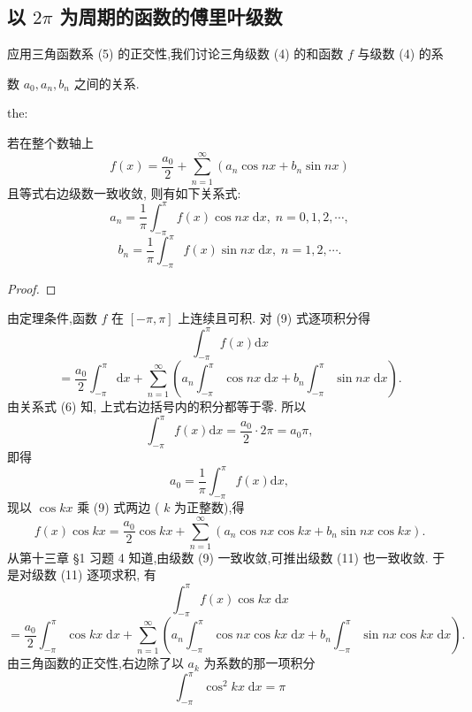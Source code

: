 \subsection{以 \({2\pi }\) 为周期的函数的傅里叶级数}

应用三角函数系 (5) 的正交性,我们讨论三角级数 (4) 的和函数 \(f\) 与级数 (4) 的系

数 \({a}_{0},{a}_{n},{b}_{n}\) 之间的关系.

\begin{theorem}{}{the:}

\end{theorem}
 若在整个数轴上
\[
f\left( x\right)  = \frac{{a}_{0}}{2} + \mathop{\sum }\limits_{{n = 1}}^{\infty }\left( {{a}_{n}\cos {nx} + {b}_{n}\sin {nx}}\right)  \tag{9}
\]
且等式右边级数一致收敛, 则有如下关系式:
\[
{a}_{n} = \frac{1}{\pi }{\int }_{-\pi }^{\pi }f\left( x\right) \cos {nx}\mathrm{\;d}x,\;n = 0,1,2,\cdots , \tag{10}
\]
\[
{b}_{n} = \frac{1}{\pi }{\int }_{-\pi }^{\pi }f\left( x\right) \sin {nx}\mathrm{\;d}x,\;n = 1,2,\cdots .
\]
\begin{proof}

\end{proof}
由定理条件,函数 \(f\) 在 \(\left\lbrack  {-\pi ,\pi }\right\rbrack\) 上连续且可积. 对 (9) 式逐项积分得
\[
{\int }_{-\pi }^{\pi }f\left( x\right) \mathrm{d}x
\]
\[
= \frac{{a}_{0}}{2}{\int }_{-\pi }^{\pi }\mathrm{d}x + \mathop{\sum }\limits_{{n = 1}}^{\infty }\left( {{a}_{n}{\int }_{-\pi }^{\pi }\cos {nx}\mathrm{\;d}x + {b}_{n}{\int }_{-\pi }^{\pi }\sin {nx}\mathrm{\;d}x}\right) .
\]
由关系式 (6) 知, 上式右边括号内的积分都等于零. 所以
\[
{\int }_{-\pi }^{\pi }f\left( x\right) \mathrm{d}x = \frac{{a}_{0}}{2} \cdot  {2\pi } = {a}_{0}\pi ,
\]
即得
\[
{a}_{0} = \frac{1}{\pi }{\int }_{-\pi }^{\pi }f\left( x\right) \mathrm{d}x,
\]
现以 \(\cos {kx}\) 乘 (9) 式两边 ( \(k\) 为正整数),得
\[
f\left( x\right) \cos {kx} = \frac{{a}_{0}}{2}\cos {kx} + \mathop{\sum }\limits_{{n = 1}}^{\infty }\left( {{a}_{n}\cos {nx}\cos {kx} + {b}_{n}\sin {nx}\cos {kx}}\right) . \tag{11}
\]
从第十三章 §1 习题 4 知道,由级数 (9) 一致收敛,可推出级数 (11) 也一致收敛. 于是对级数 (11) 逐项求积, 有
\[
{\int }_{-\pi }^{\pi }f\left( x\right) \cos {kx}\mathrm{\;d}x
\]
\[
= \frac{{a}_{0}}{2}{\int }_{-\pi }^{\pi }\cos {kx}\mathrm{\;d}x + \mathop{\sum }\limits_{{n = 1}}^{\infty }\left( {{a}_{n}{\int }_{-\pi }^{\pi }\cos {nx}\cos {kx}\mathrm{\;d}x + {b}_{n}{\int }_{-\pi }^{\pi }\sin {nx}\cos {kx}\mathrm{\;d}x}\right) .
\]
由三角函数的正交性,右边除了以 \({a}_{k}\) 为系数的那一项积分
\[
{\int }_{-\pi }^{\pi }{\cos }^{2}{kx}\mathrm{\;d}x = \pi
\]

